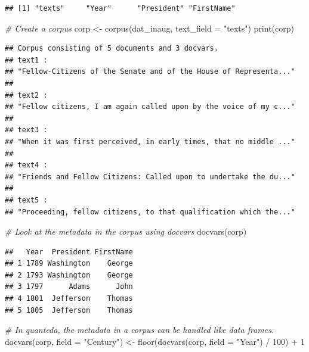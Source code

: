 \documentclass[
  12pt,
]{style/krantz}
\newenvironment{Shaded}{\begin{snugshade}}{\end{snugshade}}
\newcommand{\AttributeTok}[1]{\textcolor[rgb]{0.77,0.63,0.00}{#1}}
\newcommand{\CommentTok}[1]{\textcolor[rgb]{0.56,0.35,0.01}{\textit{#1}}}
\newcommand{\DecValTok}[1]{\textcolor[rgb]{0.00,0.00,0.81}{#1}}
\newcommand{\FunctionTok}[1]{\textcolor[rgb]{0.00,0.00,0.00}{#1}}
\newcommand{\NormalTok}[1]{#1}
\newcommand{\OtherTok}[1]{\textcolor[rgb]{0.56,0.35,0.01}{#1}}
\newcommand{\SpecialCharTok}[1]{\textcolor[rgb]{0.00,0.00,0.00}{#1}}
\newcommand{\StringTok}[1]{\textcolor[rgb]{0.31,0.60,0.02}{#1}}
\begin{document}
\begin{verbatim}
## [1] "texts"     "Year"      "President" "FirstName"
\end{verbatim}

\begin{Shaded}
\begin{Highlighting}[]
\CommentTok{\# Create a corpus}
\NormalTok{corp }\OtherTok{\textless{}{-}} \FunctionTok{corpus}\NormalTok{(dat\_inaug, }\AttributeTok{text\_field =} \StringTok{"texts"}\NormalTok{)}
\FunctionTok{print}\NormalTok{(corp)}
\end{Highlighting}
\end{Shaded}

\begin{verbatim}
## Corpus consisting of 5 documents and 3 docvars.
## text1 :
## "Fellow-Citizens of the Senate and of the House of Representa..."
## 
## text2 :
## "Fellow citizens, I am again called upon by the voice of my c..."
## 
## text3 :
## "When it was first perceived, in early times, that no middle ..."
## 
## text4 :
## "Friends and Fellow Citizens: Called upon to undertake the du..."
## 
## text5 :
## "Proceeding, fellow citizens, to that qualification which the..."
\end{verbatim}

\begin{Shaded}
\begin{Highlighting}[]
\CommentTok{\# Look at the metadata in the corpus using \textasciigrave{}docvars\textasciigrave{}}
\FunctionTok{docvars}\NormalTok{(corp)}
\end{Highlighting}
\end{Shaded}

\begin{verbatim}
##   Year  President FirstName
## 1 1789 Washington    George
## 2 1793 Washington    George
## 3 1797      Adams      John
## 4 1801  Jefferson    Thomas
## 5 1805  Jefferson    Thomas
\end{verbatim}

\begin{Shaded}
\begin{Highlighting}[]
\CommentTok{\# In quanteda, the metadata in a corpus can be handled like data frames.}
\FunctionTok{docvars}\NormalTok{(corp, }\AttributeTok{field =} \StringTok{"Century"}\NormalTok{) }\OtherTok{\textless{}{-}} \FunctionTok{floor}\NormalTok{(}\FunctionTok{docvars}\NormalTok{(corp, }\AttributeTok{field =} \StringTok{"Year"}\NormalTok{) }\SpecialCharTok{/} \DecValTok{100}\NormalTok{) }\SpecialCharTok{+} \DecValTok{1}
\end{Highlighting}
\end{Shaded}
\end{document}

